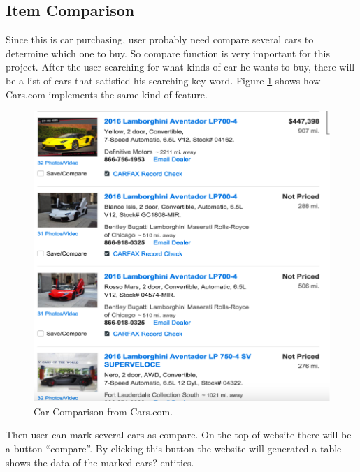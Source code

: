 \documentclass[12pt]{article}
\begin{document}
\subsection{Item Comparison}
Since this is car purchasing, user probably need compare several cars to determine which one to buy. So compare function is very important for this project. After the user searching for what kinds of car he wants to buy, there will be a list of cars that satisfied his searching key word. Figure \ref{car_comparison} shows how Cars.com implements the same kind of feature.
\begin{figure}[!h]
\caption{Car Comparison from Cars.com.} \label{car_comparison}
\begin{center}
\includegraphics[width=13cm]{car_comparison}
\end{center}
\end{figure}
\par Then user can mark several cars as compare. On the top of website there will be a button ``compare''. By clicking this button the website will generated a table shows the data of the marked cars? entities.

\newpage
\end{document}
